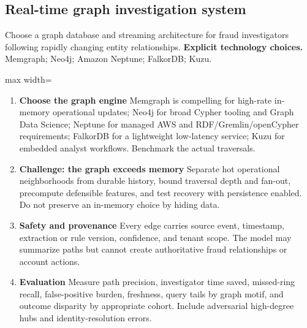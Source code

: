 \subsection{Real-time graph investigation system}
Choose a graph database and streaming architecture for fraud investigators following rapidly changing entity relationships.
\textbf{Explicit technology choices.} Memgraph; Neo4j; Amazon Neptune; FalkorDB; Kuzu.
\begin{center}\begin{adjustbox}{max width=\linewidth}\end{adjustbox}\end{center}
\begin{enumerate}
\item \textbf{Choose the graph engine} Memgraph is compelling for high-rate in-memory operational updates; Neo4j for broad Cypher tooling and Graph Data Science; Neptune for managed AWS and RDF/Gremlin/openCypher requirements; FalkorDB for a lightweight low-latency service; Kuzu for embedded analyst workflows. Benchmark the actual traversals.
\item \textbf{Challenge: the graph exceeds memory} Separate hot operational neighborhoods from durable history, bound traversal depth and fan-out, precompute defensible features, and test recovery with persistence enabled. Do not preserve an in-memory choice by hiding data.
\item \textbf{Safety and provenance} Every edge carries source event, timestamp, extraction or rule version, confidence, and tenant scope. The model may summarize paths but cannot create authoritative fraud relationships or account actions.
\item \textbf{Evaluation} Measure path precision, investigator time saved, missed-ring recall, false-positive burden, freshness, query tails by graph motif, and outcome disparity by appropriate cohort. Include adversarial high-degree hubs and identity-resolution errors.
\end{enumerate}
